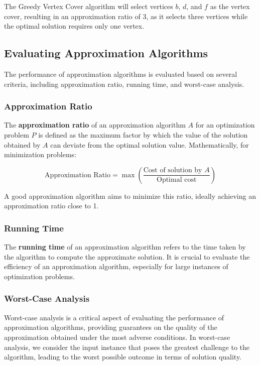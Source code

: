 \documentclass[12pt]{book} %
\begin{document}
The Greedy Vertex Cover algorithm will select vertices \(b\), \(d\), and \(f\) as the vertex cover, resulting in an approximation ratio of \(3\), as it selects three vertices while the optimal solution requires only one vertex.

\subsection{Evaluating Approximation Algorithms}

The performance of approximation algorithms is evaluated based on several criteria, including approximation ratio, running time, and worst-case analysis.

\subsubsection{Approximation Ratio}

The \textbf{approximation ratio} of an approximation algorithm \(A\) for an optimization problem \(P\) is defined as the maximum factor by which the value of the solution obtained by \(A\) can deviate from the optimal solution value. Mathematically, for minimization problems:

\[
\text{Approximation Ratio} = \max \left( \frac{\text{Cost of solution by } A}{\text{Optimal cost}} \right)
\]

A good approximation algorithm aims to minimize this ratio, ideally achieving an approximation ratio close to 1.

\subsubsection{Running Time}

The \textbf{running time} of an approximation algorithm refers to the time taken by the algorithm to compute the approximate solution. It is crucial to evaluate the efficiency of an approximation algorithm, especially for large instances of optimization problems.

\subsubsection{Worst-Case Analysis}

Worst-case analysis is a critical aspect of evaluating the performance of approximation algorithms, providing guarantees on the quality of the approximation obtained under the most adverse conditions. In worst-case analysis, we consider the input instance that poses the greatest challenge to the algorithm, leading to the worst possible outcome in terms of solution quality.
\end{document}
